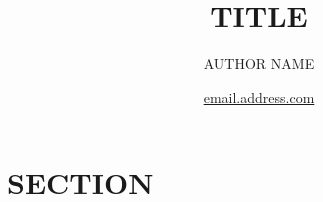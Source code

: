 \documentclass[12p,twoside,english]{article}
\newcommand{\subtitle}[1]{%
  \posttitle{%
    \par\end{center}
    \begin{center}\large#1\end{center}
    \vskip0.5em}%
}
\begin{document}
\author{AUTHOR NAME \vspace{-0.9cm}}


\title{\vspace{-3cm} \singlespace TITLE   \vspace{-0.5cm}}
\date{\vspace{-0.5cm} \url{email.address.com}}


\maketitle


\vspace{-0.5cm}



\section{SECTION}







\end{document}
